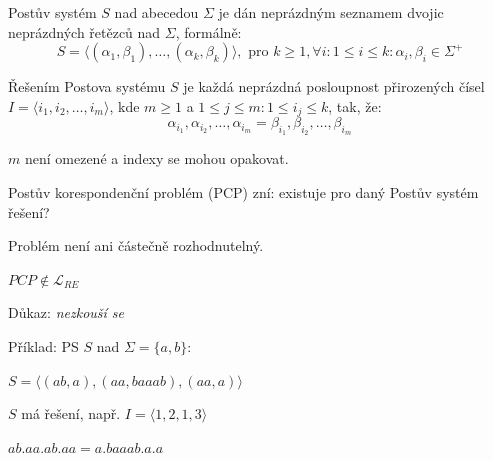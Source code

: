 \begin{compactitem}
    \item Postův systém $S$ nad abecedou $\Sigma$ je dán neprázdným seznamem dvojic neprázdných řetězců nad $\Sigma$, formálně: $$ S = \langle (\alpha_1 , \beta_1), \dots, (\alpha_k , \beta_k) \rangle, \text{ pro } k \geq 1, \forall i : 1 \leq i \leq k : \alpha_i, \beta_i \in \Sigma^+ $$

    \item Řešením Postova systému $S$ je každá neprázdná posloupnost přirozených čísel $I = \langle i_1, i_2, \dots, i_m \rangle$, kde $m \geq 1$ a $1 \leq j \leq m : 1 \leq i_j \leq k$, tak, že: $$ \alpha_{i_1}, \alpha_{i_2}, \dots, \alpha_{i_m} = \beta_{i_1}, \beta_{i_2}, \dots, \beta_{i_m} $$ \begin{compactitem}
        \item $m$ není omezené a indexy se mohou opakovat.
    \end{compactitem}

    \item Postův korespondenční problém (PCP) zní: existuje pro daný Postův systém řešení?

    \item Problém není ani částečně rozhodnutelný. \begin{compactitem}
        \item $PCP \not\in \mathcal{L}_{RE}$
        \item Důkaz: \textit{nezkouší se}
    \end{compactitem}

    \item Příklad: PS $S$ nad $\Sigma = \{ a, b \}$: \begin{compactitem}
        \item $S = \langle (ab, a), (aa, baaab), (aa, a) \rangle$
        \item $S$ má řešení, např. $I = \langle 1, 2, 1, 3\rangle$ \begin{compactitem}
            \item $ab . aa . ab . aa = a . baaab . a . a$
        \end{compactitem}
    \end{compactitem}

\end{compactitem}

